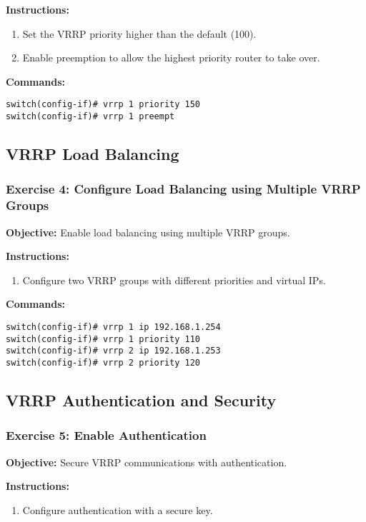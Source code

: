 \documentclass[12pt]{article}
\begin{document}
\textbf{Instructions:}
\begin{enumerate}
\item Set the VRRP priority higher than the default (100).
\item Enable preemption to allow the highest priority router to take over.
\end{enumerate}

\textbf{Commands:}
\begin{lstlisting}[style=CiscoCLI]
switch(config-if)# vrrp 1 priority 150
switch(config-if)# vrrp 1 preempt
\end{lstlisting}

\bigskip

\subsection{VRRP Load Balancing}

\subsubsection*{Exercise 4: Configure Load Balancing using Multiple VRRP Groups}
\textbf{Objective:} Enable load balancing using multiple VRRP groups.

\textbf{Instructions:}
\begin{enumerate}
\item Configure two VRRP groups with different priorities and virtual IPs.
\end{enumerate}

\textbf{Commands:}
\begin{lstlisting}[style=CiscoCLI]
switch(config-if)# vrrp 1 ip 192.168.1.254
switch(config-if)# vrrp 1 priority 110
switch(config-if)# vrrp 2 ip 192.168.1.253
switch(config-if)# vrrp 2 priority 120
\end{lstlisting}

\bigskip

\subsection{VRRP Authentication and Security}

\subsubsection*{Exercise 5: Enable Authentication}
\textbf{Objective:} Secure VRRP communications with authentication.

\textbf{Instructions:}
\begin{enumerate}
\item Configure authentication with a secure key.
\end{enumerate}
\end{document}
